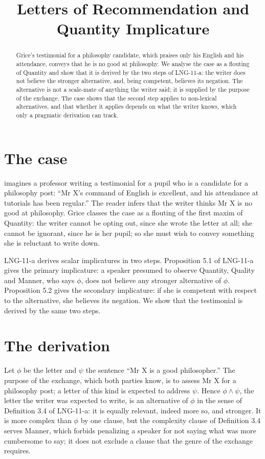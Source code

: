 \documentclass{situationist-preprint}
\title{Letters of Recommendation and Quantity Implicature}
\begin{document}
\maketitle

\begin{abstract}
Grice's testimonial for a philosophy candidate, which praises only his English and his attendance, conveys that he is no good at philosophy. We analyse the case as a flouting of Quantity and show that it is derived by the two steps of LNG-11-a: the writer does not believe the stronger alternative, and, being competent, believes its negation. The alternative is not a scale-mate of anything the writer said; it is supplied by the purpose of the exchange. The case shows that the second step applies to non-lexical alternatives, and that whether it applies depends on what the writer knows, which only a pragmatic derivation can track.
\end{abstract}

\section{The case}

\citet[52]{Grice1975} imagines a professor writing a testimonial for a pupil who is a candidate for a philosophy post: \enquote{Mr X's command of English is excellent, and his attendance at tutorials has been regular.} The reader infers that the writer thinks Mr X is no good at philosophy. Grice classes the case as a flouting of the first maxim of Quantity: the writer cannot be opting out, since she wrote the letter at all; she cannot be ignorant, since he is her pupil; so she must wish to convey something she is reluctant to write down.

LNG-11-a derives scalar implicatures in two steps. Proposition 5.1 of LNG-11-a gives the primary implicature: a speaker presumed to observe Quantity, Quality and Manner, who says $\phi$, does not believe any stronger alternative of $\phi$. Proposition 5.2 gives the secondary implicature: if she is competent with respect to the alternative, she believes its negation. We show that the testimonial is derived by the same two steps.

\section{The derivation}

Let $\phi$ be the letter and $\psi$ the sentence \enquote{Mr X is a good philosopher.} The purpose of the exchange, which both parties know, is to assess Mr X for a philosophy post; a letter of this kind is expected to address $\psi$. Hence $\phi \wedge \psi$, the letter the writer was expected to write, is an alternative of $\phi$ in the sense of Definition 3.4 of LNG-11-a: it is equally relevant, indeed more so, and stronger. It is more complex than $\phi$ by one clause, but the complexity clause of Definition 3.4 serves Manner, which forbids penalizing a speaker for not saying what was more cumbersome to say; it does not exclude a clause that the genre of the exchange requires.
\end{document}
